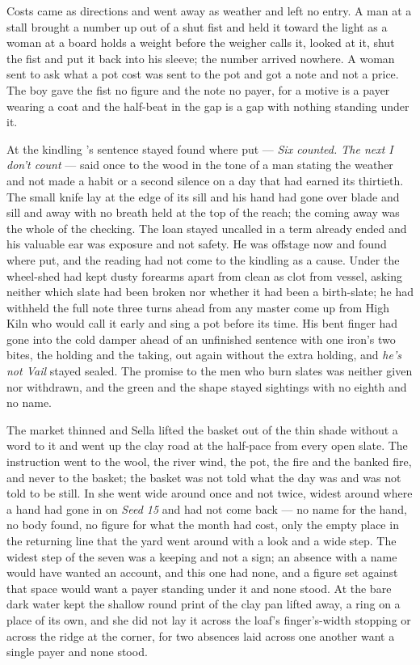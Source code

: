Costs came as directions and went away as weather and left no entry. A man at a stall brought a number up out of a shut fist and held it toward the light as a woman at a board holds a weight before the weigher calls it, looked at it, shut the fist and put it back into his sleeve; the number arrived nowhere. A woman sent to ask what a pot cost was sent to the pot and got a note and not a price. The boy gave the fist no figure and the note no payer, for a motive is a payer wearing a coat and the half-beat in the gap is a gap with nothing standing under it.

At the kindling 's sentence stayed found where put --- \emph{Six counted. The next I don't count} --- said once to the wood in the tone of a man stating the weather and not made a habit or a second silence on a day that had earned its thirtieth. The small knife lay at the edge of its sill and his hand had gone over blade and sill and away with no breath held at the top of the reach; the coming away was the whole of the checking. The loan stayed uncalled in a term already ended and his valuable ear was exposure and not safety. He was offstage now and found where put, and the reading had not come to the kindling as a cause. Under the wheel-shed  had kept dusty forearms apart from clean as clot from vessel, asking neither which slate had been broken nor whether it had been a birth-slate; he had withheld the full note three turns ahead from any master come up from High Kiln who would call it early and sing a pot before its time. His bent finger had gone into the cold damper ahead of an unfinished sentence with one iron's two bites, the holding and the taking, out again without the extra holding, and \emph{he's not Vail} stayed sealed. The promise to the men who burn slates was neither given nor withdrawn, and the green and the shape stayed sightings with no eighth and no name.

The market thinned and Sella lifted the basket out of the thin shade without a word to it and went up the clay road at the half-pace from every open slate. The instruction went to the wool, the river wind, the pot, the fire and the banked fire, and never to the basket; the basket was not told what the day was and was not told to be still. In  she went wide around  once and not twice, widest around  where a hand had gone in on \emph{Seed 15} and had not come back --- no name for the hand, no body found, no figure for what the month had cost, only the empty place in the returning line that the yard went around with a look and a wide step. The widest step of the seven was a keeping and not a sign; an absence with a name would have wanted an account, and this one had none, and a figure set against that space would want a payer standing under it and none stood. At  the bare dark water kept the shallow round print of the clay pan lifted away, a ring on a place of its own, and she did not lay it across the loaf's finger's-width stopping or across the ridge at the corner, for two absences laid across one another want a single payer and none stood.

